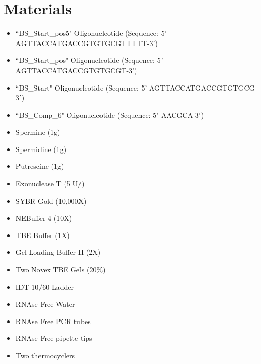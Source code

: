 \documentclass{ssiBio}
\begin{document}
\section{Materials}
\begin{itemize}
\item{``BS\_Start\_pos5" Oligonucleotide (Sequence:  5'-AGTTACCATGACCGTGTGCGTTTTT-3')}
\item{``BS\_Start\_pos" Oligonucleotide (Sequence:  5'-AGTTACCATGACCGTGTGCGT-3')}
\item{``BS\_Start" Oligonucleotide (Sequence:  5'-AGTTACCATGACCGTGTGCG-3')}
\item{``BS\_Comp\_6" Oligonucleotide (Sequence:  5'-AACGCA-3')}
\item{Spermine (1g)}
\item{Spermidine (1g)}
\item{Putrescine (1g)}
\item{Exonuclease T (5 U/\uL{})}
\item{SYBR Gold (10,000X)}
\item{NEBuffer 4 (10X)}
\item{TBE Buffer (1X)}
\item{Gel Loading Buffer II (2X)}
\item{Two Novex TBE Gels (20\%)}
\item{IDT 10/60 Ladder}
\item{RNAse Free Water}
\item{RNAse Free PCR tubes}
\item{RNAse Free pipette tips}
\item{Two thermocyclers}
\end{itemize}
\end{document}
